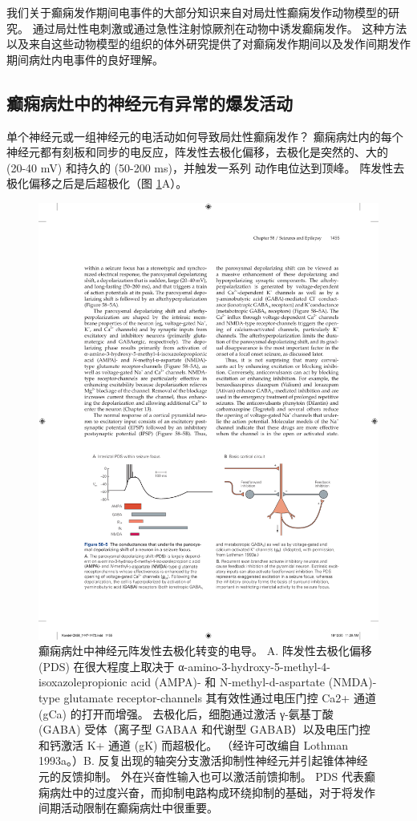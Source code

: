 我们关于癫痫发作期间电事件的大部分知识来自对局灶性癫痫发作动物模型的研究。 通过局灶性电刺激或通过急性注射惊厥剂在动物中诱发癫痫发作。 这种方法以及来自这些动物模型的组织的体外研究提供了对癫痫发作期间以及发作间期发作期间病灶内电事件的良好理解。

\subsection{癫痫病灶中的神经元有异常的爆发活动}

单个神经元或一组神经元的电活动如何导致局灶性癫痫发作？ 癫痫病灶内的每个神经元都有刻板和同步的电反应，阵发性去极化偏移，去极化是突然的、大的 (20-40 mV) 和持久的 (50-200 ms)，并触发一系列 动作电位达到顶峰。 阵发性去极化偏移之后是后超极化（图 \ref{fig:58_5}A）。

\begin{figure}[htbp]
	\centering
	\includegraphics[width=0.9\linewidth]{chap58/fig_58_5}
	\caption{癫痫病灶中神经元阵发性去极化转变的电导。 A. 阵发性去极化偏移 (PDS) 在很大程度上取决于 α-amino-3-hydroxy-5-methyl-4-isoxazolepropionic acid (AMPA)- 和 N-methyl-d-aspartate (NMDA)-type glutamate receptor-channels 其有效性通过电压门控 Ca2+ 通道 (gCa) 的打开而增强。 去极化后，细胞通过激活 γ-氨基丁酸 (GABA) 受体（离子型 GABAA 和代谢型 GABAB）以及电压门控和钙激活 K+ 通道 (gK) 而超极化。 （经许可改编自 Lothman 1993a。）B. 反复出现的轴突分支激活抑制性神经元并引起锥体神经元的反馈抑制。 外在兴奋性输入也可以激活前馈抑制。 PDS 代表癫痫病灶中的过度兴奋，而抑制电路构成环绕抑制的基础，对于将发作间期活动限制在癫痫病灶中很重要。}
	\label{fig:58_5}
\end{figure}

